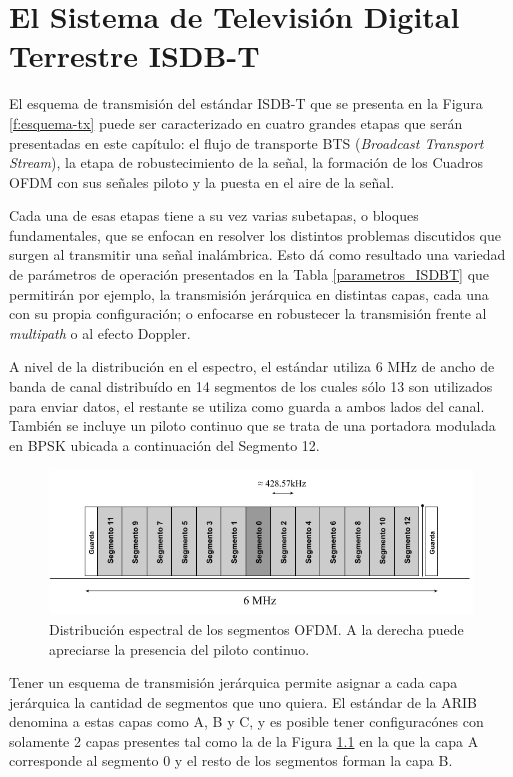 \chapter{El Sistema de Televisión Digital Terrestre ISDB-T}

El esquema de transmisión del estándar ISDB-T que se presenta en la Figura \ref{f:esquema-tx} puede ser caracterizado en cuatro grandes etapas que serán presentadas en este capítulo: el flujo de transporte BTS (\textit{Broadcast Transport Stream}), la etapa de robustecimiento de la señal, la formación de los Cuadros OFDM con sus señales piloto y la puesta en el aire de la señal.

Cada una de esas etapas tiene a su vez varias subetapas, o bloques fundamentales, que se enfocan en resolver los distintos problemas discutidos que surgen al transmitir una señal inalámbrica. Esto dá como resultado una variedad de parámetros de operación presentados en la Tabla \ref{parametros_ISDBT} que permitirán por ejemplo, la transmisión jerárquica en distintas capas, cada una con su propia configuración; o enfocarse en robustecer la transmisión frente al \textit{multipath} o al efecto Doppler.

A nivel de la distribuci\'on en el espectro, el estándar utiliza 6 MHz de ancho de banda de canal distribu\'ido en 14 segmentos de los cuales sólo 13 son utilizados para enviar datos, el restante se utiliza como guarda a ambos lados del canal. Tambi\'en se incluye un piloto continuo que se trata de una portadora modulada en BPSK ubicada a continuaci\'on del Segmento 12.

\begin{figure}
\centering
\includegraphics[scale=0.55]{figuras/cap03/segmentos_isdbt}
\caption{\label{segmentos_isdbt} Distribuci\'on espectral de los segmentos OFDM. A la derecha puede apreciarse la presencia del piloto continuo.}
\end{figure}

Tener un esquema de transmisi\'on jer\'arquica permite asignar a cada capa jer\'arquica la cantidad de segmentos que uno quiera. El est\'andar de la ARIB denomina a estas capas como A, B y C, y es posible tener configurac\'ones con solamente 2 capas presentes tal como la de la Figura \ref{segmentos_isdbt} en la que la capa A corresponde al segmento 0 y el resto de los segmentos forman la capa B.

